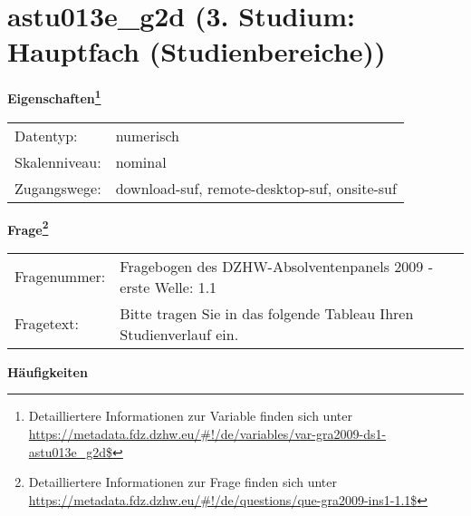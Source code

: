 
    \setcounter{footnote}{0}

    \vspace*{-1.8cm}
	\section{astu013e\_g2d (3. Studium: Hauptfach (Studienbereiche))}
	\label{section:astu013e_g2d}



    \vspace*{0.5cm}
    \noindent\textbf{Eigenschaften\footnote{Detailliertere Informationen zur Variable finden sich unter
		\url{https://metadata.fdz.dzhw.eu/\#!/de/variables/var-gra2009-ds1-astu013e_g2d$}}}\\
	\begin{tabularx}{\hsize}{@{}lX}
	Datentyp: & numerisch \\
	Skalenniveau: & nominal \\
	Zugangswege: &
	  download-suf, 
	  remote-desktop-suf, 
	  onsite-suf
 \\
    \end{tabularx}



				\vspace*{0.5cm}
                \noindent\textbf{Frage\footnote{Detailliertere Informationen zur Frage finden sich unter
		              \url{https://metadata.fdz.dzhw.eu/\#!/de/questions/que-gra2009-ins1-1.1$}}}\\
				\begin{tabularx}{\hsize}{@{}lX}
					Fragenummer: &
					  Fragebogen des DZHW-Absolventenpanels 2009 - erste Welle:
					  1.1
 \\
					Fragetext: & Bitte tragen Sie in das folgende Tableau Ihren Studienverlauf ein. \\
				\end{tabularx}





        		\vspace*{0.5cm}
                \noindent\textbf{Häufigkeiten}

